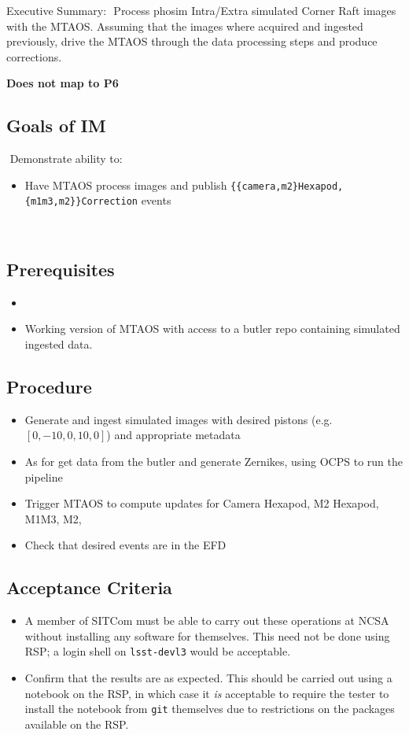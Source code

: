 Executive Summary:
​
Process phosim Intra/Extra simulated Corner Raft images with the MTAOS.
Assuming that the images where acquired and ingested previously, drive the MTAOS through the data processing steps and produce corrections.

\textbf{Does not map to P6}
​
\subsection{Goals of IM}
​
Demonstrate ability to:
​
\begin{itemize}
\item Have MTAOS process images and publish
  \texttt{\{\{camera,m2\}Hexapod,\{m1m3,m2\}\}Correction} events
\end{itemize}
​
\subsection{Prerequisites}
\begin{itemize}
\item {}
\item Working version of MTAOS with access to a butler repo containing simulated ingested data.
\end{itemize}

\subsection{Procedure}
\begin{itemize}
\item Generate and ingest simulated images with desired pistons (e.g. $[0, -10, 0, 10, 0]$) and appropriate
  metadata
\item As for  get data from the butler and generate Zernikes, using OCPS to run the pipeline
\item Trigger MTAOS to compute updates for Camera Hexapod, M2 Hexapod, M1M3, M2, 
\item Check that desired events are in the EFD
\end{itemize}

\subsection{Acceptance Criteria}
\begin{itemize}
\item A member of SITCom must be able to carry out these operations at NCSA without installing any
  software for themselves.  This need not be done using RSP; a login shell on \eg \texttt{lsst-devl3}
  would be acceptable.
\item Confirm that the results are as expected.  This should be carried out using a notebook on the RSP,
  in which case it \textit{is} acceptable to require the tester to install the notebook from \texttt{git}
  themselves due to restrictions on the packages available on the RSP.
\end{itemize}
